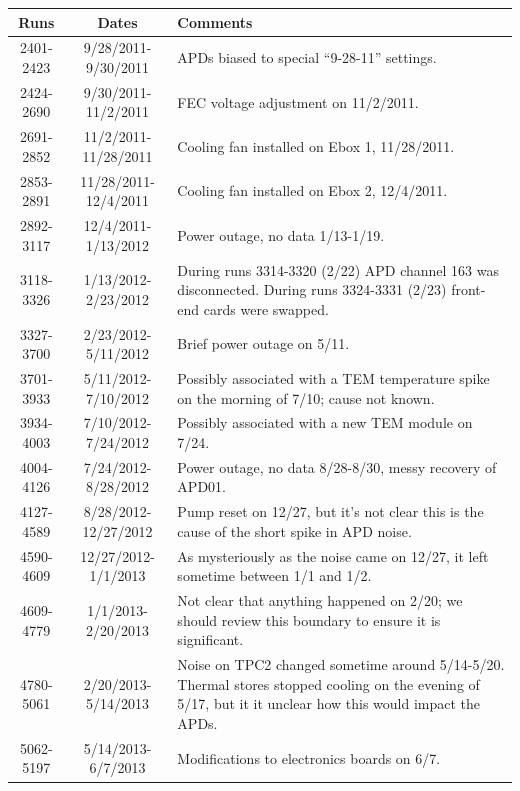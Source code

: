 \begin{table}
\begin{singlespace}
\begin{center}
\begin{tabular}{|c|c|p{}|}\hline
Runs & Dates & Comments \\\hline
2401-2423 & 9/28/2011-9/30/2011 & APDs biased to special ``9-28-11'' settings. \\\hline
2424-2690 & 9/30/2011-11/2/2011 & FEC voltage adjustment on 11/2/2011. \\\hline
2691-2852 & 11/2/2011-11/28/2011 & Cooling fan installed on Ebox 1, 11/28/2011. \\\hline
2853-2891 & 11/28/2011-12/4/2011 & Cooling fan installed on Ebox 2, 12/4/2011. \\\hline
2892-3117 & 12/4/2011-1/13/2012 & Power outage, no data 1/13-1/19. \\\hline
3118-3326 & 1/13/2012-2/23/2012 & During runs 3314-3320 (2/22) APD channel 163 was disconnected.  During runs 3324-3331 (2/23) front-end cards were swapped.\\\hline
3327-3700 & 2/23/2012-5/11/2012 & Brief power outage on 5/11. \\\hline
3701-3933 & 5/11/2012-7/10/2012 & Possibly associated with a TEM temperature spike on the morning of 7/10; cause not known. \\\hline
3934-4003 & 7/10/2012-7/24/2012 & Possibly associated with a new TEM module on 7/24. \\\hline
4004-4126 & 7/24/2012-8/28/2012 & Power outage, no data 8/28-8/30, messy recovery of APD01. \\\hline
4127-4589 & 8/28/2012-12/27/2012 & Pump reset on 12/27, but it's not clear this is the cause of the short spike in APD noise. \\\hline
4590-4609 & 12/27/2012-1/1/2013 & As mysteriously as the noise came on 12/27, it left sometime between 1/1 and 1/2. \\\hline
4609-4779 & 1/1/2013-2/20/2013 & Not clear that anything happened on 2/20; we should review this boundary to ensure it is significant. \\\hline
4780-5061 & 2/20/2013-5/14/2013 & Noise on TPC2 changed sometime around 5/14-5/20.  Thermal stores stopped cooling on the evening of 5/17, but it it unclear how this would impact the APDs. \\\hline
5062-5197 & 5/14/2013-6/7/2013 & Modifications to electronics boards on 6/7. \\\hline

\end{tabular}
\end{center}
\end{singlespace}
\end{table}
